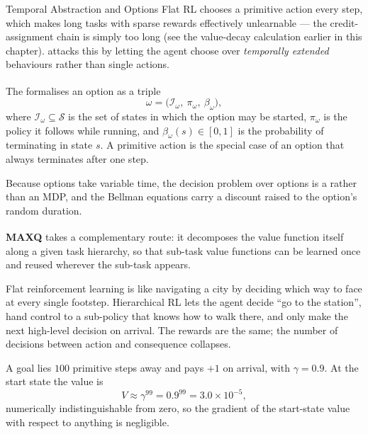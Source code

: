 \begin{v3topic}{Temporal Abstraction and Options}
        Flat RL chooses a primitive action every step, which makes long tasks
        with sparse rewards effectively unlearnable --- the credit-assignment
        chain is simply too long (see the value-decay calculation earlier in
        this chapter).  attacks
        this by letting the agent choose over \emph{temporally extended}
        behaviours rather than single actions.

        The \textsuperscript{\cite{suttonBetweenMDPsSemiMDPs1999}}
        formalises an option as a triple
        \begin{equation}
            \omega = \bigl(\mathcal{I}_\omega,\ \pi_\omega,\
            \beta_\omega\bigr),
            \label{eq:rl-option}
        \end{equation}
        where $\mathcal{I}_\omega \subseteq \mathcal{S}$ is the set of states
        in which the option may be started, $\pi_\omega$ is the policy it
        follows while running, and $\beta_\omega(s) \in [0,1]$ is the
        probability of terminating in state $s$. A primitive action is the
        special case of an option that always terminates after one step.

        Because options take variable time, the decision problem over options
        is a \keyterm{semi-Markov decision process} rather than an MDP, and
        the Bellman equations carry a discount raised to the option's random
        duration.

        \textbf{MAXQ}\textsuperscript{\cite{dietterichHierarchicalReinforcementLearning2000}}
        takes a complementary route: it decomposes the value function itself
        along a given task hierarchy, so that sub-task value functions can be
        learned once and reused wherever the sub-task appears.

\begin{plainlanguage}
Flat reinforcement learning is like navigating a city by deciding which way to
face at every single footstep. Hierarchical RL lets the agent decide ``go to
the station'', hand control to a sub-policy that knows how to walk there, and
only make the next high-level decision on arrival. The rewards are the same;
the number of decisions between action and consequence collapses.
\end{plainlanguage}

\begin{workedexample}
A goal lies $100$ primitive steps away and pays $+1$ on arrival, with
$\gamma = 0.9$. At the start state the value is
\[
  V \approx \gamma^{99} = 0.9^{99} = 3.0\times10^{-5},
\]
numerically indistinguishable from zero, so the gradient of the start-state
value with respect to anything is negligible.


\end{workedexample}
\end{v3topic}
